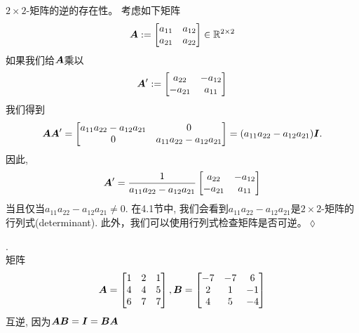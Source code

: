 \begin{remark}
    $2 \times 2$-矩阵的逆的存在性。 考虑如下矩阵
    \begin{equation}
        \boldsymbol{A} :=
        \begin{bmatrix}
            a_{11} & a_{12} \\
            a_{21} & a_{22}
        \end{bmatrix}
        \in \mathbb{R}^{2 \times 2}
    \end{equation}
    如果我们给$\boldsymbol{A}$乘以
    \begin{equation}
        \boldsymbol{A}' :=
        \begin{bmatrix}
            a_{22} & - a_{12} \\
            - a_{21} & a_{11}
        \end{bmatrix}
    \end{equation}
    我们得到
    \begin{equation}
        \boldsymbol{A}\boldsymbol{A}' =
        \begin{bmatrix}
            a_{11}a_{22} - a_{12}a_{21} & 0 \\
            0 & a_{11}a_{22} - a_{12}a_{21}
        \end{bmatrix}=
        (a_{11}a_{22} - a_{12}a_{21}) \boldsymbol{I}.
    \end{equation}
    因此,
    \begin{equation}
        \boldsymbol{A}' =
        \frac{1}{a_{11}a_{22} - a_{12}a_{21}}
        \begin{bmatrix}
            a_{22} & - a_{12} \\
            - a_{21} & a_{11}
        \end{bmatrix}
    \end{equation}
    当且仅当$a_{11}a_{22} - a_{12}a_{21} \neq 0$.
    在4.1节中, 我们会看到$a_{11}a_{22} - a_{12}a_{21}$是$2 \times 2$-矩阵的行列式(determinant).
    此外，我们可以使用行列式检查矩阵是否可逆。\hfill $\lozenge$
\end{remark}

\begin{example}[逆矩阵].\\
    矩阵
    \begin{equation}
        \boldsymbol{A}=
        \begin{bmatrix}
            1 & 2 & 1 \\
            4 & 4 & 5 \\
            6 & 7 & 7
        \end{bmatrix},
        \boldsymbol{B}=
        \begin{bmatrix}
            -7 & -7 & 6 \\
            2 & 1 & -1 \\
            4 & 5 & -4
        \end{bmatrix}
    \end{equation}
    互逆, 因为$\boldsymbol{A}\boldsymbol{B} = \boldsymbol{I} = \boldsymbol{B}\boldsymbol{A}$
\end{example}

